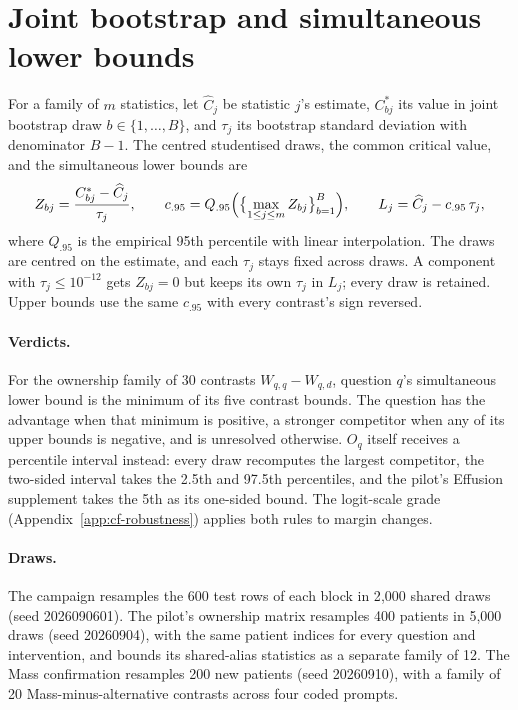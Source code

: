 \documentclass{article}
\begin{document}
\FloatBarrier

\section{Joint bootstrap and simultaneous lower bounds}
\label{app:simultaneous-bounds}

For a family of $m$ statistics, let $\widehat C_j$ be statistic $j$'s estimate, $C^*_{bj}$ its value in joint bootstrap draw $b\in\{1,\dots,B\}$, and $\tau_j$ its bootstrap standard deviation with denominator $B-1$. The centred studentised draws, the common critical value, and the simultaneous lower bounds are
\begin{equation}
Z_{bj}=\frac{C^*_{bj}-\widehat C_j}{\tau_j},\qquad
c_{.95}=Q_{.95}\Bigl(\bigl\{\max_{1\leq j\leq m}Z_{bj}\bigr\}_{b=1}^{B}\Bigr),\qquad
L_j=\widehat C_j-c_{.95}\,\tau_j,
\label{eq:max-t}
\end{equation}
where $Q_{.95}$ is the empirical 95th percentile with linear interpolation. The draws are centred on the estimate, and each $\tau_j$ stays fixed across draws. A component with $\tau_j\leq10^{-12}$ gets $Z_{bj}=0$ but keeps its own $\tau_j$ in $L_j$; every draw is retained. Upper bounds use the same $c_{.95}$ with every contrast's sign reversed.

\paragraph{Verdicts.} For the ownership family of 30 contrasts $W_{q,q}-W_{q,d}$, question $q$'s simultaneous lower bound is the minimum of its five contrast bounds. The question has the advantage when that minimum is positive, a stronger competitor when any of its upper bounds is negative, and is unresolved otherwise. $O_q$ itself receives a percentile interval instead: every draw recomputes the largest competitor, the two-sided interval takes the 2.5th and 97.5th percentiles, and the pilot's Effusion supplement takes the 5th as its one-sided bound. The logit-scale grade (Appendix~\ref{app:cf-robustness}) applies both rules to margin changes.

\paragraph{Draws.} The campaign resamples the 600 test rows of each block in 2{,}000 shared draws (seed 2026090601). The pilot's ownership matrix resamples 400 patients in 5{,}000 draws (seed 20260904), with the same patient indices for every question and intervention, and bounds its shared-alias statistics as a separate family of 12. The Mass confirmation resamples 200 new patients (seed 20260910), with a family of 20 Mass-minus-alternative contrasts across four coded prompts.
\end{document}
